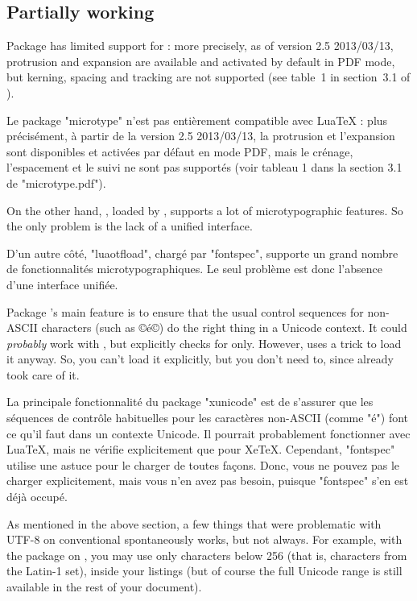 \documentclass{lltxdoc}
\begin{document}
\subsection{Partially working}\label{partial}

Package  has limited support for \luatex: more precisely, as of
version 2.5 2013/03/13, protrusion and expansion are available and activated
by default in PDF mode, but kerning, spacing and tracking are not supported
(see table~1 in section~3.1 of ).

Le package "microtype" n'est pas entièrement compatible avec LuaTeX : plus précisément, à partir de la version 2.5 2013/03/13, la protrusion et l'expansion sont disponibles et activées par défaut en mode PDF, mais le crénage, l'espacement et le suivi ne sont pas supportés (voir tableau 1 dans la section 3.1 de "microtype.pdf").

On the other hand, , loaded by , supports a lot of
microtypographic features. So the only problem is the lack of a unified
interface.

D'un autre côté, "luaotfload", chargé par "fontspec", supporte un grand nombre de fonctionnalités microtypographiques. Le seul problème est donc l'absence d'une interface unifiée.

Package 's main feature is to ensure that the usual control
sequences for non-ASCII characters (such as ©\'e©) do the right thing in a
Unicode context. It could \emph{probably} work with \luatex, but explicitly
checks for \xetex only. However,  uses a trick to load it anyway.
So, you can't load it explicitly, but you don't need to, since 
already took care of it.

La principale fonctionnalité du package "xunicode" est de s'assurer que les séquences de contrôle habituelles pour les caractères non-ASCII (comme "\'e") font ce qu'il faut dans un contexte Unicode. Il pourrait probablement fonctionner avec LuaTeX, mais ne vérifie explicitement que pour XeTeX. Cependant, "fontspec" utilise une astuce pour le charger de toutes façons. Donc, vous ne pouvez pas le charger explicitement, mais vous n'en avez pas besoin, puisque "fontspec" s'en est déjà occupé.

As mentioned in the above section, a few things that were problematic with
UTF-8 on conventional \latex spontaneously works, but not always. For example,
with the  package on \lualatex, you may use only characters below
256 (that is, characters from the Latin-1 set), inside your listings (but of
course the full Unicode range is still available in the rest of your
document).
\end{document}
